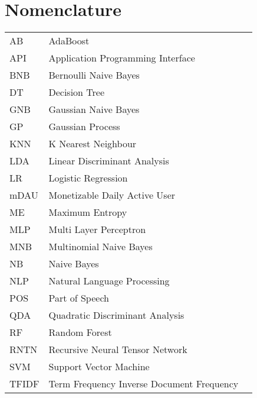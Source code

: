 \chapter*{\Huge{Nomenclature}}
\begin{tabular}{lp{9cm}l}
AB      &   AdaBoost                                \\
API     &   Application Programming Interface       \\
BNB     &   Bernoulli Naive Bayes                   \\
DT      &   Decision Tree                           \\
GNB     &   Gaussian Naive Bayes                    \\
GP      &   Gaussian Process                        \\
KNN     &   K Nearest Neighbour                     \\
LDA     &   Linear Discriminant Analysis            \\
LR      &   Logistic Regression                     \\
mDAU    &   Monetizable Daily Active User           \\
ME      &   Maximum Entropy                         \\
MLP     &   Multi Layer Perceptron                  \\
MNB     &   Multinomial Naive Bayes                 \\
NB      &    Naive Bayes                            \\
NLP     &   Natural Language Processing             \\
POS     &   Part of Speech                          \\
QDA     &   Quadratic Discriminant Analysis         \\
RF      &   Random Forest                           \\
RNTN    &   Recursive Neural Tensor Network         \\
SVM     &   Support Vector Machine                  \\
TFIDF   &   Term Frequency Inverse Document Frequency \\

\end{tabular}
\vspace{2cm}